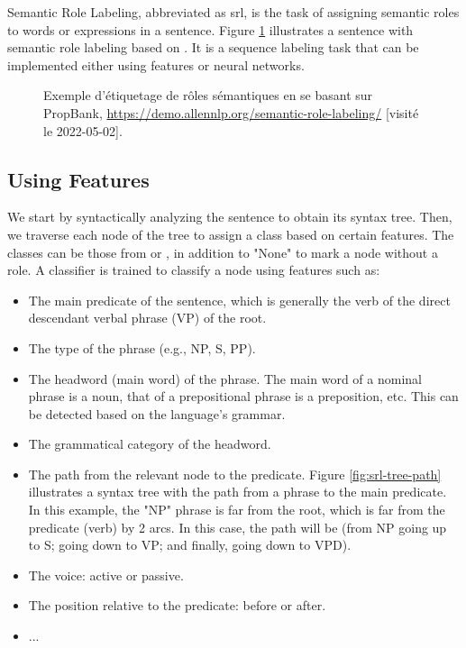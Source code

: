 \documentclass{KBook}
\begin{document}
Semantic Role Labeling, abbreviated as \ac{srl}, is the task of assigning semantic roles to words or expressions in a sentence. Figure \ref{fig:srl-exp} illustrates a sentence with semantic role labeling based on . It is a sequence labeling task that can be implemented either using features or neural networks.


\begin{figure}[ht]
	\centering
	\caption[Exemple d'étiquetage de rôles sémantiques en se basant sur PropBank.]{Exemple d'étiquetage de rôles sémantiques en se basant sur PropBank, \url{https://demo.allennlp.org/semantic-role-labeling/} [visité le 2022-05-02].}
	\label{fig:srl-exp}
\end{figure}

\subsection{Using Features}

We start by syntactically analyzing the sentence to obtain its syntax tree. Then, we traverse each node of the tree to assign a class based on certain features. The classes can be those from  or , in addition to "None" to mark a node without a role. A classifier is trained to classify a node using features such as:
\begin{itemize}
	\item The main predicate of the sentence, which is generally the verb of the direct descendant verbal phrase (VP) of the root.
	\item The type of the phrase (e.g., NP, S, PP).
	\item The headword (main word) of the phrase. The main word of a nominal phrase is a noun, that of a prepositional phrase is a preposition, etc. This can be detected based on the language's grammar.
	\item The grammatical category of the headword.
	\item The path from the relevant node to the predicate. Figure \ref{fig:srl-tree-path} illustrates a syntax tree with the path from a phrase to the main predicate. In this example, the "NP" phrase is far from the root, which is far from the predicate (verb) by 2 arcs. In this case, the path will be  (from NP going up to S; going down to VP; and finally, going down to VPD).
	\item The voice: active or passive.
	\item The position relative to the predicate: before or after.
	\item ...
\end{itemize}
\end{document}

